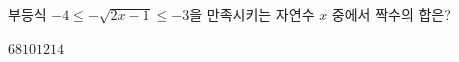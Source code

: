 부등식 $-4\le -\sqrt{2x-1}\le -3$을 만족시키는 자연수 $x$ 중에서 짝수의 합은?
\begin{choices32}{$6$}{$8$}{$10$}{$12$}{$14$}\end{choices32}
